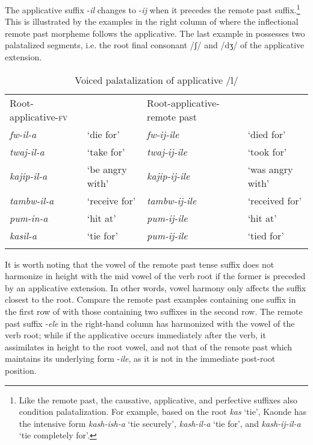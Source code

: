 \documentclass[output=paper]{langsci/langscibook}
\begin{document}
The applicative suffix -\textit{il} changes to -\textit{ij} when it precedes the remote past suffix.\footnote{Like the remote past, the causative, applicative, and perfective suffixes also condition palatalization. For example, based on the root \textit{kas} ‘tie’, Kaonde has the intensive form \textit{kash-ish-a} ‘tie securely’, \textit{kash-il-a} ‘tie for’, and \textit{kash-ij-il-a} ‘tie completely for’.} This is illustrated by the examples in the right column of  where the inflectional remote past morpheme follows the applicative. The last example in  possesses two palatalized segments, i.e. the root final consonant /ʃ/ and /dʒ/ of the applicative extension. 


\begin{table}
\begin{tabular}{llll}
\lsptoprule
Root-applicative-\textsc{fv} &  & Root-applicative-remote past & \\
\textit{fw-il-a} & `die for' & \textit{fw-ij-ile} & `died for' \\
\textit{twaj-il-a} & `take for' & \textit{twaj-ij-ile} & `took for' \\
\textit{kajip-il-a} & `be angry with' & \textit{kajip-ij-ile} & `was angry with' \\
\textit{tambw-il-a} & `receive for' & \textit{tambw-ij-ile} & `received for' \\
\textit{pum-in-a} & `hit at' & \textit{pum-ij-ile} & `hit at' \\
\textit{kasil-a} & `tie for' & \textit{pum-ij-ile} & `tied for' \\

\lspbottomrule
\end{tabular}

\caption{Voiced palatalization of applicative /l/}
\label{tab:13.kawasha}
\end{table}

It is worth noting that the vowel of the remote past tense suffix does not harmonize in height with the mid vowel of the verb root if the former is preceded by an applicative extension. In other words, vowel harmony only affects the suffix closest to the root. Compare the remote past examples containing one suffix in the first row of  with those containing two suffixes in the second row. The remote past suffix -\textit{ele} in the right-hand column has harmonized with the vowel of the verb root; while if the applicative occurs immediately after the verb, it assimilates in height to the root  vowel, and not that of the remote past which maintains its underlying form -\textit{ile}, as it is not in the immediate post-root position.
 
\end{document}
